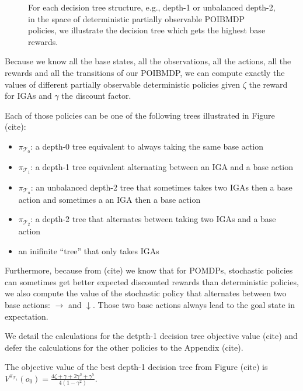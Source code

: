\begin{figure}[htbp]
    \caption{For each decision tree structure, e.g., depth-1 or unbalanced depth-2, in the space of deterministic partially observable POIBMDP policies, we illustrate the decision tree which gets the highest base rewards.}
    \label{fig:optimal-policy-trees}
\end{figure}

Because we know all the base states, all the observations, all the actions, all the rewards and all the transitions of our POIBMDP, we can compute exactly the values of different partially observable deterministic policies given $\zeta$ the reward for IGAs and $\gamma$ the discount factor.

Each of those policies can be one of the following trees illustrated in Figure (cite): 
\begin{itemize}
    \item $\pi_{\mathcal{T}_0}$: a depth-0 tree equivalent to always taking the same base action 
    \item $\pi_{\mathcal{T}_1}$: a depth-1 tree equivalent alternating between an IGA and a base action 
    \item $\pi_{\mathcal{T}_u}$: an unbalanced depth-2 tree that sometimes takes two IGAs then a base action and sometimes a an IGA then a base action
    \item $\pi_{\mathcal{T}_2}$: a depth-2 tree that alternates between taking two IGAs and a base action
    \item an inifinite ``tree'' that only takes IGAs
\end{itemize}
Furthermore, because from (cite) we know that for POMDPs, stochastic policies can sometimes get better expected discounted rewards than deterministic policies, we also compute the value of the stochastic policy that alternates between two base actions: $\rightarrow$ and $\downarrow$.
Those two base actions always lead to the goal state in expectation.

We detail the calculations for the detpth-1 decision tree objective value (cite) and defer the calculations for the other policies to the Appendix (cite).

\begin{proposition} The objective value of the best depth-1 decision tree from Figure (cite) is $V^{\pi_{\mathcal{T}_1}}(o_0) = \frac{4\zeta + \gamma + 2\gamma^3 + \gamma^5}{4(1-\gamma^2)}$.
\end{proposition}


